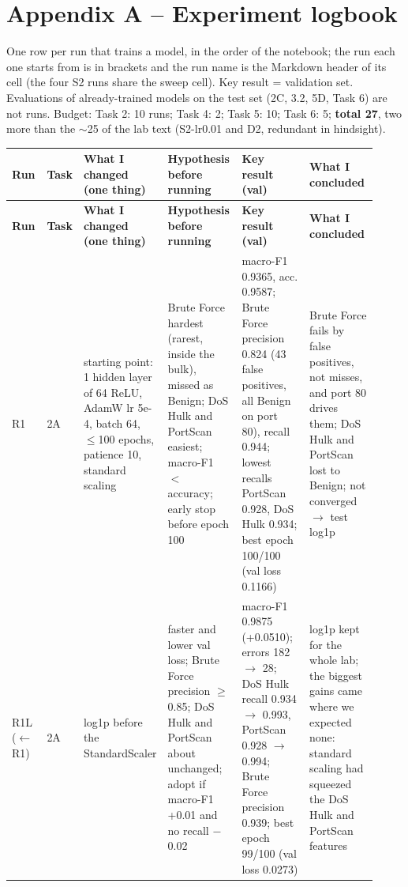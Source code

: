 \section*{Appendix A -- Experiment logbook}
One row per run that trains a model, in the order of the notebook; the run each one starts from is in brackets and the run name is the Markdown header of its cell (the four S2 runs share the sweep cell). Key result = validation set. Evaluations of already-trained models on the test set (2C, 3.2, 5D, Task 6) are not runs. Budget: Task 2: 10 runs; Task 4: 2; Task 5: 10; Task 6: 5; \textbf{total 27}, two more than the $\sim$25 of the lab text (S2-lr0.01 and D2, redundant in hindsight).

{\footnotesize
\setlength{\tabcolsep}{3pt}
\renewcommand{\arraystretch}{1.15}
\begin{longtable}{>{\raggedright\arraybackslash}p{0.10\linewidth}>{\raggedright\arraybackslash}p{0.035\linewidth}>{\raggedright\arraybackslash}p{0.145\linewidth}>{\raggedright\arraybackslash}p{0.215\linewidth}>{\raggedright\arraybackslash}p{0.225\linewidth}>{\raggedright\arraybackslash}p{0.20\linewidth}}
\hline
\textbf{Run} & \textbf{Task} & \textbf{What I changed (one thing)} & \textbf{Hypothesis before running} & \textbf{Key result (val)} & \textbf{What I concluded} \\ \hline
\endfirsthead
\hline
\textbf{Run} & \textbf{Task} & \textbf{What I changed (one thing)} & \textbf{Hypothesis before running} & \textbf{Key result (val)} & \textbf{What I concluded} \\ \hline
\endhead
R1 & 2A & starting point: 1 hidden layer of 64 ReLU, AdamW lr 5e-4, batch 64, $\leq$100 epochs, patience 10, standard scaling & Brute Force hardest (rarest, inside the bulk), missed as Benign; DoS Hulk and PortScan easiest; macro-F1 $<$ accuracy; early stop before epoch 100 & macro-F1 0.9365, acc. 0.9587; Brute Force precision 0.824 (43 false positives, all Benign on port 80), recall 0.944; lowest recalls PortScan 0.928, DoS Hulk 0.934; best epoch 100/100 (val loss 0.1166) & Brute Force fails by false positives, not misses, and port 80 drives them; DoS Hulk and PortScan lost to Benign; not converged $\rightarrow$ test log1p \\ \hline
R1L ($\leftarrow$R1) & 2A & log1p before the StandardScaler & faster and lower val loss; Brute Force precision $\geq$ 0.85; DoS Hulk and PortScan about unchanged; adopt if macro-F1 +0.01 and no recall $-$0.02 & macro-F1 0.9875 (+0.0510); errors 182 $\rightarrow$ 28; DoS Hulk recall 0.934 $\rightarrow$ 0.993, PortScan 0.928 $\rightarrow$ 0.994; Brute Force precision 0.939; best epoch 99/100 (val loss 0.0273) & log1p kept for the whole lab; the biggest gains came where we expected none: standard scaling had squeezed the DoS Hulk and PortScan features \\ \hline

\end{longtable}}

